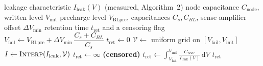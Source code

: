 \begin{algorithm}[!t]
\caption{Quasi-static retention time from measured leakage}
\label{alg:quasi_static_retention_time_from_measured_leakage}
\begin{algorithmic}[1]
\Require leakage characteristic $I_{\mathrm{leak}}(V)$ (measured, Algorithm~2)
\Require node capacitance $C_{\mathrm{node}}$, written level $V_{\mathrm{init}}$
\Require precharge level $V_{\mathrm{BLpre}}$, capacitances $C_s, C_{BL}$, sense-amplifier offset $\Delta V_{\min}$
\Ensure retention time $t_{\mathrm{ret}}$ and a censoring flag
    \State $V_{\mathrm{fail}} \leftarrow V_{\mathrm{BLpre}} + \Delta V_{\min}\,\dfrac{C_s+C_{BL}}{C_s}$
        \Return $t_{\mathrm{ret}} \leftarrow 0$
    \EndIf
    \State $\mathcal{V} \leftarrow$ uniform grid on $[V_{\mathrm{fail}}, V_{\mathrm{init}}]$
    \State $I \leftarrow \textsc{Interp}(I_{\mathrm{leak}}, \mathcal{V})$
        \Return $t_{\mathrm{ret}} \leftarrow \infty$ \textbf{(censored)}
    \EndIf
    \State $t_{\mathrm{ret}} \leftarrow \displaystyle\int_{V_{\mathrm{fail}}}^{V_{\mathrm{init}}} \frac{C_{\mathrm{node}}}{I_{\mathrm{leak}}(V)}\,\mathrm{d}V$
    \Return $t_{\mathrm{ret}}$
\end{algorithmic}
\end{algorithm}
